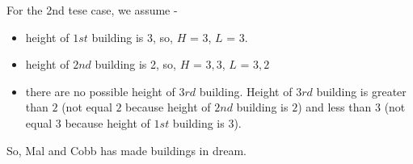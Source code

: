 For the 2nd tese case, we assume - 
\begin{itemize}
\item height of $1st$ building is 3, so, $H$ = ${3}$, $L$ = ${3}$.
\item height of $2nd$ building is 2, so, $H$ = ${3, 3}$, $L$ = ${3, 2}$
\item there are no possible height of $3rd$ building. Height of $3rd$ building is greater than $2$ (not equal $2$ because height of $2nd$ building is $2$) and less than $3$ (not equal $3$ because height of $1st$ building is $3$).
\end{itemize}
So, Mal and Cobb has made buildings in dream.